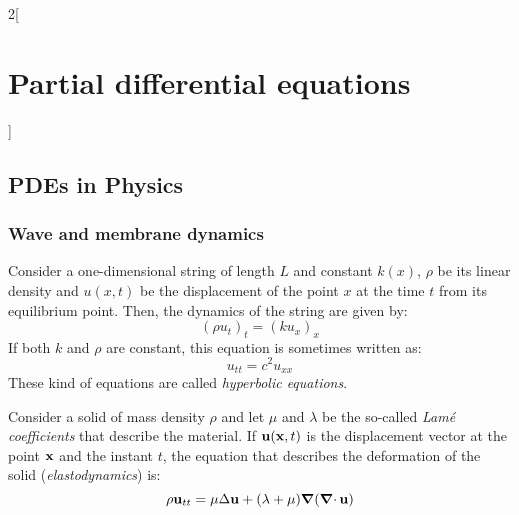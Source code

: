 \documentclass[../../../main_math.tex]{subfiles}
\begin{document}
\renewcommand{\col}{\apl}
\begin{multicols}{2}[\section{Partial differential equations}]
  \subsection{PDEs in Physics}
  \subsubsection{Wave and membrane dynamics}
  \begin{proposition}
    Consider a one-dimensional string of length $L$ and constant $k(x)$, $\rho$ be its linear density and $u(x,t)$ be the displacement of the point $x$ at the time $t$ from its equilibrium point. Then, the dynamics of the string are given by: $${(\rho u_{t})}_t={(ku_x)}_x$$ If both $k$ and $\rho$ are constant, this equation is sometimes written as:
    \begin{equation}
      u_{tt}=c^2u_{xx}
    \end{equation}
    These kind of equations are called \emph{hyperbolic equations}.
  \end{proposition}
  \begin{proposition}
    Consider a solid of mass density $\rho$ and let $\mu$ and $\lambda$ be the so-called \emph{Lamé coefficients} that describe the material. If $\boldsymbol{\mathrm{u}}(\boldsymbol{\mathrm{x}},t)$ is the displacement vector at the point $\boldsymbol{\mathrm{x}}$ and the instant $t$, the equation that describes the deformation of the solid (\emph{elastodynamics}) is:
    $$\rho\boldsymbol{\mathrm{u}}_{tt}=\mu\Delta\boldsymbol{\mathrm{u}}+(\lambda+\mu)\grad(\operatorname{\boldsymbol{\mathrm{\nabla}}\cdot}{\boldsymbol{\mathrm{u}}})$$
  \end{proposition}

\end{multicols}
\end{document}
